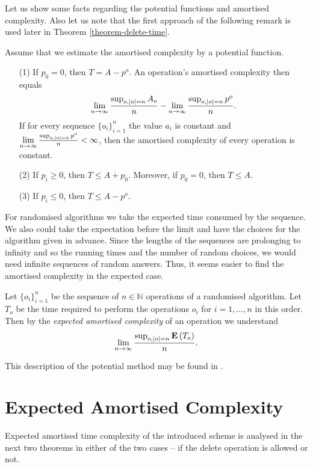Let us show some facts regarding the potential functions and amortised complexity. Also let us note that the first approach of the following remark is used later in Theorem \ref{theorem-delete-time}.
\begin{claim}
\label{claim-amortised-complexity}
Assume that we estimate the amortised complexity by a potential function.
\begin{enumerate}
\item [(1)] If $p_0 = 0$, then $T = A - p^o$. An operation's amortised complexity then equals \[ \lim\limits_{n \rightarrow \infty} \frac{\sup\displaylimits_{o, |o| = n} A_o}{n} - \lim\limits_{n \rightarrow \infty} \frac{\sup\displaylimits_{o, |o| = n} p^o}{n} \text{.} \] If for every sequence $\{o_i\}_{i = 1}^{n}$ the value $a_i$ is constant and $\lim\limits_{n \rightarrow \infty} \frac{\sup\displaylimits_{o, |o| = n} p^o}{n} < \infty$, then the amortised complexity of every operation is constant.
\item [(2)] If $p_i \geq 0$, then $T \leq A + p_0$. Moreover, if $p_0 = 0$, then $T \leq A$.
\item [(3)] If $p_i \leq 0$, then $T \leq A - p^o$.
\end{enumerate}
\end{claim}

For randomised algorithms we take the expected time consumed by the sequence. We also could take the expectation before the limit and have the choices for the algorithm given in advance. Since the lengths of the sequences are prolonging to infinity and so the running times and the number of random choices, we would need infinite sequences of random answers. Thus, it seems easier to find the amortised complexity in the expected case.

\begin{definition}
Let $\{o_i\}_{i = 1}^{n}$ be the sequence of $n \in \mathbb{N}$ operations of a randomised algorithm. Let $T_o$ be the time required to perform the operations $o_i$ for $i = 1, \dots, n$ in this order. Then by the \emph{expected amortised complexity} of an operation we understand \[ \lim\limits_{n \rightarrow \infty}\frac{\sup_{o, |o| = n}\mathbf{E}\left(T_o\right)}{n} \text{.} \]
\end{definition}

This description of the potential method may be found in \cite{VK-skripta}.

\section{Expected Amortised Complexity}
Expected amortised time complexity of the introduced scheme is analysed in the next two theorems in either of the two cases -- if the delete operation is allowed or not.

